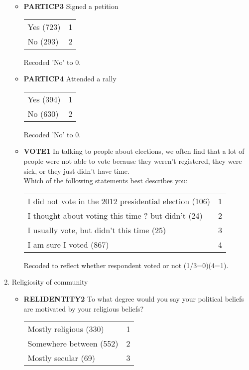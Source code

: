 \documentclass{article}
\begin{document}
\begin{enumerate}
\begin{itemize}
		\item \textbf{PARTICP3} Signed a petition
				\begin{table}[H]
				\centering
				\begin{tabular}{l l}
				Yes (723)	&	1 \\
				No (293)	&	2 \\
				\end{tabular}
				\end{table}
				Recoded 'No' to 0.
		\item \textbf{PARTICP4} Attended a rally
				\begin{table}[H]
				\centering
				\begin{tabular}{l l}
				Yes (394)	&	1 \\
				No (630)	&	2 \\
				\end{tabular}
				\end{table}
				Recoded 'No' to 0.
				
		\item \textbf{VOTE1} In talking to people about elections, we often find that a lot of people were not able to vote because they weren't registered, they were sick, or they just didn't have time.\\
			Which of the following statements best describes you:
				\begin{table}[H]
				\centering
				\begin{tabular}{l l}
				I did not vote in the 2012 presidential election (106)	&		1 \\
				I thought about voting this time ? but didn't (24)		&	2 \\
				I usually vote, but didn't this time (25)			&	3 \\
				I am sure I voted (867)				&		4 \\
				\end{tabular}
				\end{table}
				Recoded to reflect whether respondent voted or not (1/3=0)(4=1).
		\end{itemize}

\item Religiosity of community

		\begin{itemize}
		\item \textbf{RELIDENTITY2} To what degree would you say your political beliefs are motivated by your religious beliefs?
		\begin{table}[H]
		\centering
		\begin{tabular}{l l}
		Mostly religious (330)	&	1 \\
		Somewhere between (552)	&	2 \\
		Mostly secular (69)		&	3 \\
		\end{tabular}
		\end{table}		
		\end{itemize}

\end{enumerate}

\newpage


\end{document}
